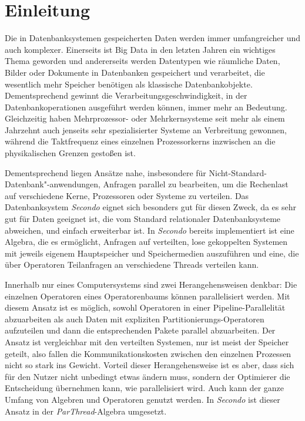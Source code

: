 \documentclass[a4paper,12pt,twoside]{article}
\newcommand{\Fb}[1]{\textit{#1}} %
\begin{document}
\clearpage
\tableofcontents
\clearpage
\raggedbottom
\thispagestyle{fancy}
\pagestyle{fancy}
\setcounter{page}{1}

\section{Einleitung}

Die in Datenbanksystemen gespeicherten Daten werden immer umfangreicher und auch komplexer. Einerseits ist Big Data in den letzten Jahren ein wichtiges Thema geworden und andererseits werden Datentypen wie räumliche Daten, Bilder oder Dokumente in Datenbanken gespeichert und verarbeitet, die wesentlich mehr Speicher benötigen als klassische Datenbankobjekte. Dementsprechend gewinnt die Verarbeitungsgeschwindigkeit, in der Datenbankoperationen ausgeführt werden können, immer mehr an Bedeutung. Gleichzeitig haben Mehrprozessor- oder Mehrkernsysteme seit mehr als einem Jahrzehnt auch jenseits sehr spezialisierter Systeme an Verbreitung gewonnen, während die Taktfrequenz eines einzelnen Prozessorkerns inzwischen an die physikalischen Grenzen gestoßen ist.

Dementsprechend liegen Ansätze nahe, insbesondere für Nicht-Standard-Datenbank"-anwendungen, Anfragen parallel zu bearbeiten, um die Rechenlast auf verschiedene Kerne, Prozessoren oder Systeme zu verteilen. Das Datenbanksystem \Fb{Secondo} eignet sich besonders gut für diesen Zweck, da es sehr gut für Daten geeignet ist, die vom Standard relationaler Datenbanksysteme abweichen, und einfach erweiterbar ist. In \Fb{Secondo} bereits implementiert ist eine Algebra, die es ermöglicht, Anfragen auf verteilten, lose gekoppelten Systemen mit jeweils eigenem Hauptspeicher und Speichermedien auszuführen und eine, die über Operatoren Teilanfragen an verschiedene Threads verteilen kann.

Innerhalb nur eines Computersystems sind zwei Herangehensweisen denkbar: Die einzelnen Operatoren eines Operatorenbaums können parallelisiert werden. Mit diesem Ansatz ist es möglich, sowohl Operatoren in einer Pipeline-Parallelität abzuarbeiten als auch Daten mit expliziten Partitionierungs-Operatoren aufzuteilen und dann die entsprechenden Pakete parallel abzuarbeiten. Der Ansatz ist vergleichbar mit den verteilten Systemen, nur ist meist der Speicher geteilt, also fallen die Kommunikationskosten zwischen den einzelnen Prozessen nicht so stark ins Gewicht. Vorteil dieser Herangehensweise ist es aber, dass sich für den Nutzer nicht unbedingt etwas ändern muss, sondern der Optimierer die Entscheidung übernehmen kann, wie parallelisiert wird. Auch kann der ganze Umfang von Algebren und Operatoren genutzt werden. In \Fb{Secondo} ist dieser Ansatz in der \Fb{ParThread}-Algebra umgesetzt.
\end{document}
